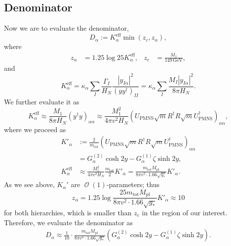 \documentclass[a4paper,11pt,captions=tableheading,DIV=12]{scrartcl}
\numberwithin{equation}{section}
\newcommand\w[1]{_{\mathrm{#1}}}
\DeclareMathOperator{\Order}{\mathcal{O}}
\newcommand\unit[1]{\,\mathrm{#1}\xspace}
\newcommand\GeV{\unit{GeV}}
\newcommand\mtot{m_{\mathrm{tot}}}
\begin{document}
\subsection{Denominator}
Now we are to evaluate the denominator,
\begin{equation}
 D_\alpha := K_\alpha^{\text{eff}}\min(z_c, z_\alpha),
\end{equation}
where
\begin{align}
 z_\alpha &= 1.25\log25 K_\alpha^{\mathrm{eff}},&
 z_c &= \frac{M_1}{149\GeV},
\end{align}
and
\begin{equation}
 K_\alpha^{\mathrm{eff}}
= \kappa_\alpha \sum_I \frac{\Gamma_I}{H_N}\frac{|y_{I\alpha}|^2}{(yy^\dagger)_{II}}
= \kappa_\alpha \sum_I \frac{M_I|y_{I\alpha}|^2}{8\pi H_N}.
\end{equation}
We further evaluate it as
\begin{equation}
 K_\alpha^{\mathrm{eff}}
\approx\frac{M_1}{8\pi H_N} (y^\dagger y)_{\alpha\alpha}
\approx\frac{M_1^2}{4\pi v^2 H_N} 
\left(
U\w{PMNS}\sqrt{m}R^\dagger R\sqrt{m}U^\dagger\w{PMNS}
\right)_{\alpha\alpha},
\end{equation}
where we proceed as
\begin{align}
 K'_\alpha
&:=
\frac{2}{\mtot}\left(
U\w{PMNS}\sqrt{m}R^\dagger R\sqrt{m}U^\dagger\w{PMNS}
\right)_{\alpha\alpha}\\
&= G_\alpha^{(2)} \cosh2y -G_\alpha^{(1)}\zeta\sinh2y,\\
 K_\alpha^{\mathrm{eff}}
&\approx\frac{M_1^2}{4\pi v^2 H_N} \frac{\mtot}{2}K'_\alpha
=
\frac{m\w{tot}M\w{pl}}{8\pi v^2 \cdot 1.66\sqrt{g_*}}K'_\alpha.
\end{align}
As we see above, $K_\alpha'$ are $\Order(1)$-parameters; thus
\begin{equation}
 z_\alpha=1.25\log\frac{25m\w{tot}M\w{pl}}{8\pi v^2 \cdot 1.66\sqrt{g_*}}K'_\alpha\approx 10
\end{equation}
for both hierarchies, which is smaller than $z_c$ in the region of our interest.
Therefore, we evaluate the denominator as
\begin{align}
 D_\alpha\approx
\frac{1}{10}\cdot\frac{m\w{tot}M\w{pl}}{8\pi v^2 \cdot 1.66\sqrt{g_*}}\left(G_\alpha^{(2)} \cosh2y -G_\alpha^{(1)}\zeta\sinh2y\right).
\end{align}
\end{document}
